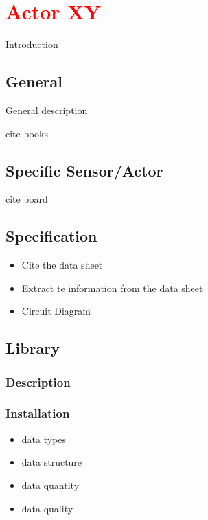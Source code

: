 %
%

\chapter{\textcolor{red}{Actor XY}}

Introduction

\section{General}

General description

cite books

\section{Specific Sensor/Actor}

cite board

\section{Specification}

\begin{itemize}
  \item Cite the data sheet
  \item Extract te information from the data sheet
  \item Circuit Diagram
\end{itemize}

\section{Library}

\subsection{Description}

\subsection{Installation}

\begin{itemize}
    \item data types
    \item data structure
    \item data quantity
    \item data quality
\end{itemize}

